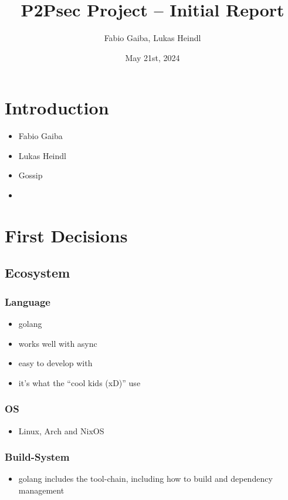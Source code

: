 \documentclass[a4paper,english,10pt,NET]{tumarticle}
\title{P2Psec Project -- Initial Report}
\author{Fabio Gaiba, Lukas Heindl}
\date{May 21st, 2024}
\begin{document}
\maketitle
{}
\thispagestyle{tumarticle}

\section{Introduction}
\begin{itemize}
	\item Fabio Gaiba
	\item Lukas Heindl
	\item Gossip
	\item {}
\end{itemize}

\section{First Decisions}
\subsection{Ecosystem}
\subsubsection{Language}
\begin{itemize}
	\item golang
	\item works well with async
	\item easy to develop with
	\item it's what the \enquote{cool kids (xD)} use
\end{itemize}

\subsubsection{OS}
\begin{itemize}
	\item Linux, Arch and NixOS
\end{itemize}

\subsubsection{Build-System}
\begin{itemize}
	\item golang includes the tool-chain, including how to build and dependency management
\end{itemize}
\end{document}
